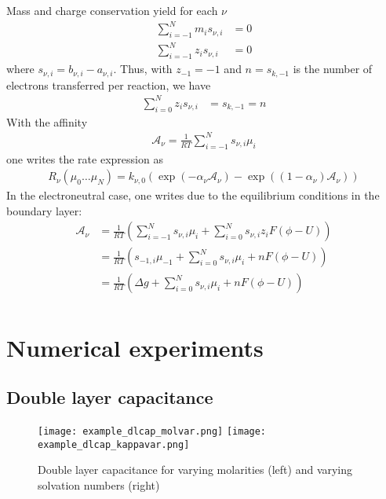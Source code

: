 \documentclass[12pt,oneside,reqno]{amsart}
\numberwithin{equation}{section}
\begin{document}
Mass and charge conservation yield for each $\nu$
\begin{align}
  \sum_{i=-1}^N m_i s_{\nu,i}&=0\\
  \sum_{i=-1}^N z_i s_{\nu,i}&=0
\end{align}
where $s_{\nu,i}=b_{\nu,i}-a_{\nu,i}$.
Thus, with $z_{-1}=-1$ and $n=s_{k,-1}$ is the number of electrons
transferred per reaction, we have
\begin{align}
  \sum_{i=0}^N z_i s_{\nu,i}&=s_{k,-1}=n
\end{align}
With the affinity
\begin{align}
  \mathcal A_\nu = \frac{1}{RT}\sum_{i=-1}^Ns_{\nu,i}\mu_i
\end{align}
one writes the rate expression as
\begin{align}\label{eq:rrate}
  R_\nu(\mu_0\dots\mu_N)= k_{\nu,0}\left(\exp(-\alpha_\nu\mathcal A_\nu) - \exp((1-\alpha_\nu)\mathcal A_\nu)\right)
\end{align}
In the electroneutral case, one writes due to the equilibrium conditions in the boundary layer:
\begin{align}
  \mathcal A_\nu &= \frac{1}{RT}\left(\sum_{i=-1}^Ns_{\nu,i}\mu_i + \sum_{i=0}^Ns_{\nu,i}z_iF(\phi -U)\right)\\
               &= \frac{1}{RT}\left(s_{-1,i}\mu_{-1}+ \sum_{i=0}^Ns_{\nu,i}\mu_i + nF(\phi -U)\right)\\
               &= \frac{1}{RT}\left(\Delta g+ \sum_{i=0}^Ns_{\nu,i}\mu_i + nF(\phi -U)\right)\\
\end{align}



\section{Numerical experiments}

\subsection{Double layer capacitance}

\begin{figure}
  \centering
  \texttt{[image: example\_dlcap\_molvar.png]}
  \texttt{[image: example\_dlcap\_kappavar.png]}
\caption{Double layer capacitance for varying molarities (left) and varying solvation numbers (right)}
\end{figure}
\clearpage
\end{document}
